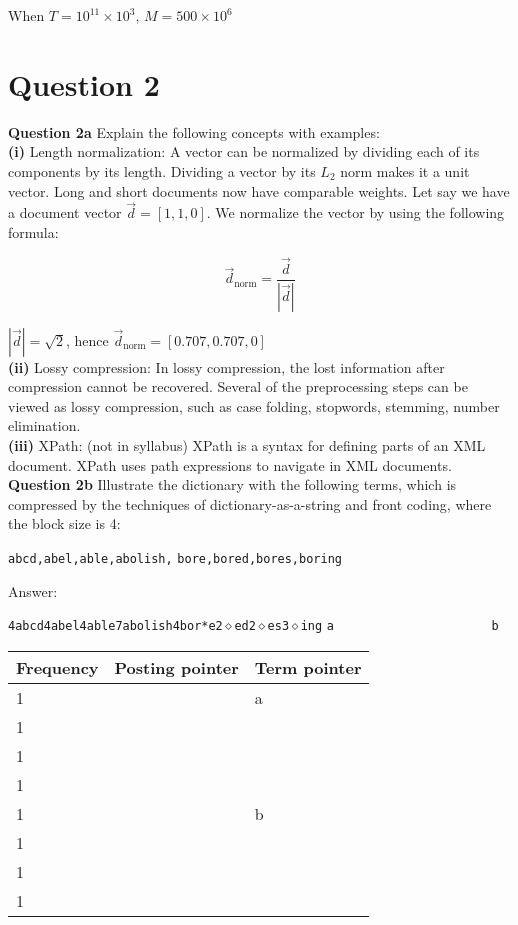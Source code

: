 \documentclass[11pt,a4paper]{report}
\begin{document}
\begin{multicols*}{2}
\noindent When $T=10^{11} \times 10^3$, $M=500 \times 10^6$

\section{Question 2}

\noindent \textbf{Question 2a} Explain the following concepts with examples:\\

\noindent \textbf{(i)} Length normalization: A vector can be normalized by dividing each of its components by its length. Dividing a vector by its $L_2$ norm makes it a unit vector. Long and short documents now have comparable weights. Let say we have a document vector $\vec{d} = [1,1,0]$. We normalize the vector by using the following formula:

$$\vec{d}_{\text{norm}} = \frac{\vec{d}}{|\vec{d}|}$$

\noindent $|\vec{d}| = \sqrt{2}$, hence $\vec{d}_{\text{norm}} = [0.707, 0.707, 0]$ \\

\noindent \textbf{(ii)} Lossy compression: In lossy compression, the lost information after compression cannot be recovered. Several of the preprocessing steps can be viewed as lossy compression, such as case folding, stopwords, stemming, number elimination. \\

\noindent \textbf{(iii)} XPath: (not in syllabus) XPath is a syntax for defining parts of an XML document. XPath uses path expressions to navigate in XML documents. \\

\noindent \textbf{Question 2b} Illustrate the dictionary with the following terms, which is compressed by the techniques of dictionary-as-a-string and front coding, where the block size is 4:
\begin{center}
\verb|abcd,abel,able,abolish,|
\verb|bore,bored,bores,boring|
\end{center}

\noindent Answer:

\noindent \verb|4abcd4abel4able7abolish4bor*e2|$\diamond$\verb|ed2|$\diamond$\verb|es3|$\diamond$\verb|ing|
\noindent \verb|a                      b|

\begin{center}
\begin{tabular}{ | l | l | l |} 
    \hline
    Frequency & Posting pointer & Term pointer \\
    \hline
    1 & & a \\
    1 & & \\
    1 & & \\
    1 & & \\
    1 & & b \\
    1 & & \\
    1 & & \\
    1 & & \\
    \hline
\end{tabular}
\end{center}


\end{multicols*}
\end{document}

